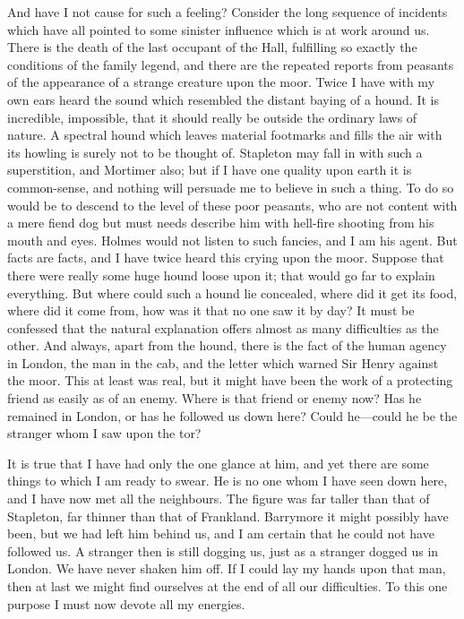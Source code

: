 \documentclass[paper=5.5in:8.5in,BCOR=7mm,twoside,DIV=calc,12pt,usegeometry,openany,chapterprefix,endperiod]{scrbook} %
\begin{document}
And have I not cause for such a feeling? Consider the long sequence of incidents which have all pointed to some sinister influence which is at work around us. There is the death of the last occupant of the Hall, fulfilling so exactly the conditions of the family legend, and there are the repeated reports from peasants of the appearance of a strange creature upon the moor. Twice I have with my own ears heard the sound which resembled the distant baying of a hound. It is incredible, impossible, that it should really be outside the ordinary laws of nature. A spectral hound which leaves material footmarks and fills the air with its howling is surely not to be thought of. Stapleton may fall in with such a superstition, and Mortimer also; but if I have one quality upon earth it is common-sense, and nothing will persuade me to believe in such a thing. To do so would be to descend to the level of these poor peasants, who are not content with a mere fiend dog but must needs describe him with hell-fire shooting from his mouth and eyes. Holmes would not listen to such fancies, and I am his agent. But facts are facts, and I have twice heard this crying upon the moor. Suppose that there were really some huge hound loose upon it; that would go far to explain everything. But where could such a hound lie concealed, where did it get its food, where did it come from, how was it that no one saw it by day? It must be confessed that the natural explanation offers almost as many difficulties as the other. And always, apart from the hound, there is the fact of the human agency in London, the man in the cab, and the letter which warned Sir Henry against the moor. This at least was real, but it might have been the work of a protecting friend as easily as of an enemy. Where is that friend or enemy now? Has he remained in London, or has he followed us down here? Could he\nobreakdash---could he be the stranger whom I saw upon the tor?

It is true that I have had only the one glance at him, and yet there are some things to which I am ready to swear. He is no one whom I have seen down here, and I have now met all the neighbours. The figure was far taller than that of Stapleton, far thinner than that of Frankland. Barrymore it might possibly have been, but we had left him behind us, and I am certain that he could not have followed us. A stranger then is still dogging us, just as a stranger dogged us in London. We have never shaken him off. If I could lay my hands upon that man, then at last we might find ourselves at the end of all our difficulties. To this one purpose I must now devote all my energies.
\end{document}
